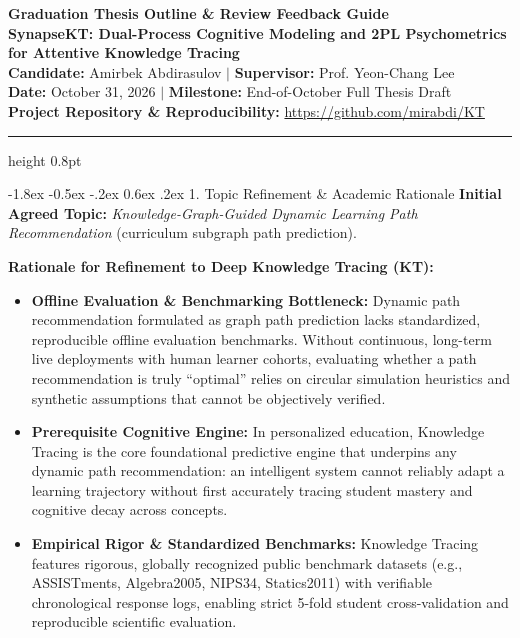 \documentclass[10.5pt,a4paper]{article}
\makeatletter
\renewcommand{\section}{\@startsection{section}{1}{\z@}%
  {-1.8ex \@plus -0.5ex \@minus -.2ex}%
  {0.6ex \@plus .2ex}%
  {\normalfont\large\bfseries\color{blue!80!black}}}
\makeatother
\begin{document}
\begin{center}
    {\Large \textbf{Graduation Thesis Outline \& Review Feedback Guide}}\\[3pt]
    {\large \textbf{SynapseKT: Dual-Process Cognitive Modeling and 2PL Psychometrics\\for Attentive Knowledge Tracing}}\\[4pt]
    \textbf{Candidate:} Amirbek Abdirasulov \quad$|$ \quad \textbf{Supervisor:} Prof. Yeon-Chang Lee\\
    \textbf{Date:} October 31, 2026 \quad$|$ \quad \textbf{Milestone:} End-of-October Full Thesis Draft\\
    \textbf{Project Repository \& Reproducibility:} \url{https://github.com/mirabdi/KT}
\end{center}

\vspace{-6pt}
\hrule height 0.8pt
\vspace{6pt}

\section{1. Topic Refinement \& Academic Rationale}
\textbf{Initial Agreed Topic:} \textit{Knowledge-Graph-Guided Dynamic Learning Path Recommendation} (curriculum subgraph path prediction).

\textbf{Rationale for Refinement to Deep Knowledge Tracing (KT):}
\begin{itemize}\setlength{\itemsep}{1.5pt}\setlength{\parskip}{0pt}\setlength{\topsep}{0pt}\setlength{\partopsep}{0pt}
    \item \textbf{Offline Evaluation \& Benchmarking Bottleneck:} Dynamic path recommendation formulated as graph path prediction lacks standardized, reproducible offline evaluation benchmarks. Without continuous, long-term live deployments with human learner cohorts, evaluating whether a path recommendation is truly ``optimal'' relies on circular simulation heuristics and synthetic assumptions that cannot be objectively verified.
    \item \textbf{Prerequisite Cognitive Engine:} In personalized education, Knowledge Tracing is the core foundational predictive engine that underpins any dynamic path recommendation: an intelligent system cannot reliably adapt a learning trajectory without first accurately tracing student mastery and cognitive decay across concepts.
    \item \textbf{Empirical Rigor \& Standardized Benchmarks:} Knowledge Tracing features rigorous, globally recognized public benchmark datasets (e.g., ASSISTments, Algebra2005, NIPS34, Statics2011) with verifiable chronological response logs, enabling strict 5-fold student cross-validation and reproducible scientific evaluation.
\end{itemize}
\end{document}
